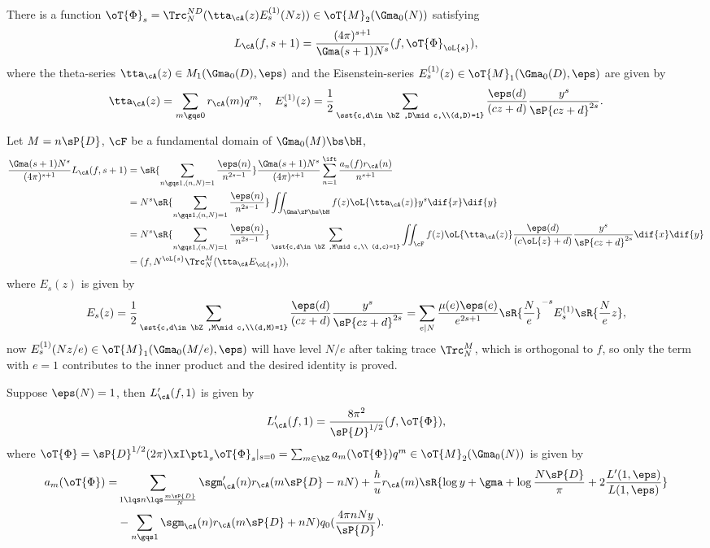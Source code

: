 \documentclass[a4paper, twoside]{article}
\begin{document}
\begin{thm}[{\cite[IV.1.2]{GZ1986}}]\label{thm:Rankin}
	There is a function $\oT{\Phi}_{s}=\Trc_{N}^{ND}(\tta_{\cA}(z)E_{s}^{(1)}(Nz))\in\oT{M}_{2}(\Gma_{0}(N))$ satisfying
	\[
		L_{\cA}(f,s+1)=\frac{(4\pi)^{s+1}}{\Gma(s+1)N^{s}}(f,\oT{\Phi}_{\oL{s}}),
	\]
	where the theta-series $\tta_{\cA}(z)\in M_{1}(\Gma_{0}(D),\eps)$ and the Eisenstein-series $E_{s}^{(1)}(z)\in \oT{M}_{1}(\Gma_{0}(D),\eps)$ are given by
	\[
		\tta_{\cA}(z)=\sum_{m\gqs0}r_{\cA}(m)q^{m},\quad E_{s}^{(1)}(z)=\frac{1}{2}\sum_{\sst{c,d\in\bZ,D\mid c,\\(d,D)=1}}\frac{\eps(d)}{(cz+d)}\frac{y^{s}}{\sP{cz+d}^{2s}}.
	\]
\end{thm}

\begin{prf}
	Let $M=n\sP{D}$, $\cF$ be a fundamental domain of $\Gma_{0}(M)\bs\bH$,
	\begin{align*}
	  \frac{\Gma(s+1)N^{s}}{(4\pi)^{s+1}}L_{\cA}(f,s+1)&=\sR{\sum_{n\gqs1,(n,N)=1}\frac{\eps(n)}{n^{2s-1}}}\frac{\Gma(s+1)N^{s}}{(4\pi)^{s+1}}\sum_{n=1}^{\ift}\frac{a_{n}(f)r_{\cA}(n)}{n^{s+1}}\\
	  &=N^{s}\sR{\sum_{n\gqs1,(n,N)=1}\frac{\eps(n)}{n^{2s-1}}}\iint_{\Gma\zF\bs\bH}f(z)\oL{\tta_{\cA}(z)}y^{s}\dif{x}\dif{y}\\
	&=N^{s}\sR{\sum_{n\gqs1,(n,N)=1}\frac{\eps(n)}{n^{2s-1}}}\sum_{\sst{c,d\in\bZ,M\mid c,\\ (d,c)=1}}\iint_{\cF}f(z)\oL{\tta_{\cA}(z)}\frac{\eps(d)}{(c\oL{z}+d)}\frac{y^{s}}{\sP{cz+d}^{2s}}\dif{x}\dif{y}\\
	  &=(f,N^{\oL{s}}\Trc_{N}^{M}(\tta_{\cA}E_{\oL{s}})),
	\end{align*}
	where $E_{s}(z)$ is given by
	\[
	  E_{s}(z)=\frac{1}{2}\sum_{\sst{c,d\in\bZ,M\mid c,\\(d,M)=1}}\frac{\eps(d)}{(cz+d)}\frac{y^{s}}{\sP{cz+d}^{2s}}=\sum_{e\mid N}\frac{\mu(e)\eps(e)}{e^{2s+1}}\sR{\frac{N}{e}}^{-s}E_{s}^{(1)}\sR{\frac{N}{e}z},
  	\]
	now $E_{s}^{(1)}(Nz/e)\in\oT{M}_{1}(\Gma_{0}(M/e),\eps)$ will have level $N/e$ after taking trace $\Trc_{N}^{M}$, which is orthogonal to $f$, so only the term with $e=1$ contributes to the inner product and the desired identity is proved.
\end{prf}

\begin{thm}[{\cite[IV.4.5]{GZ1986}}]\label{thm:coef}
	Suppose $\eps(N)=1$, then $L_{\cA}'(f,1)$ is given by
	\[
		L_{\cA}'(f,1)=\frac{8\pi^{2}}{\sP{D}^{1/2}}(f,\oT{\Phi}),
	\]
	where $\oT{\Phi}=\sP{D}^{1/2}(2\pi)\xI \ptl_{s}\oT{\Phi}_{s}|_{s=0}=\sum_{m\in\bZ}a_{m}(\oT{\Phi})q^{m}\in\oT{M}_{2}(\Gma_{0}(N))$ is given by
	\begin{align*}
	  a_{m}(\oT{\Phi})=&\sum_{1\lqs n\lqs \frac{m\sP{D}}{N}}\sgm_{\cA}'(n)r_{\cA}(m\sP{D}-nN)+\frac{h}{u}r_{\cA}(m)\sR{\log y+\gma+\log\frac{N\sP{D}}{\pi}+2\frac{L'(1,\eps)}{L(1,\eps)}}\\
					  &-\sum_{n\gqs1}\sgm_{\cA}(n)r_{\cA}(m\sP{D}+nN)q_{0}(\frac{4\pi nNy}{\sP{D}}).
	\end{align*}
\end{thm}
\end{document}
